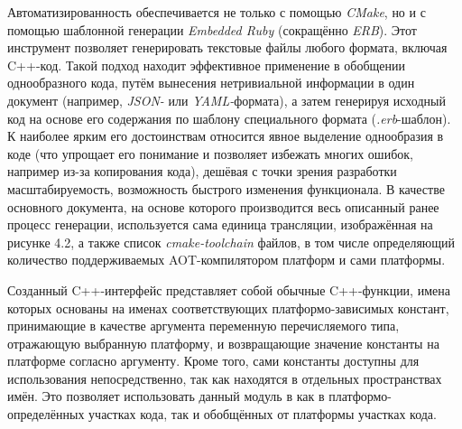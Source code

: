 \par
Автоматизированность обеспечивается не только с помощью \textit{CMake}, но и с помощью шаблонной генерации \textit{Embedded Ruby} (сокращённо \textit{ERB}). Этот инструмент позволяет генерировать текстовые файлы любого формата, включая C++-код. Такой подход находит эффективное применение в обобщении однообразного кода, путём вынесения нетривиальной информации в один документ (например, \textit{JSON-} или \textit{YAML-}формата), а затем генерируя исходный код на основе его содержания по шаблону специального формата (\textit{.erb}-шаблон). К наиболее ярким его достоинствам относится явное выделение однообразия в коде (что упрощает его понимание и позволяет избежать многих ошибок, например из-за копирования кода), дешёвая с точки зрения разработки масштабируемость, возможность быстрого изменения функционала. В качестве основного документа, на основе которого производится весь описанный ранее процесс генерации, используется сама единица трансляции, изображённая на рисунке 4.2, а также список \textit{cmake-toolchain} файлов, в том числе определяющий количество поддерживаемых AOT-компилятором платформ и сами платформы.

\par
Созданный C++-интерфейс представляет собой обычные C++-функции, имена которых основаны на именах соответствующих платформо-зависимых констант, принимающие в качестве аргумента переменную перечисляемого типа, отражающую выбранную платформу, и возвращающие значение константы на платформе согласно аргументу. Кроме того, сами константы доступны для использования непосредственно, так как находятся в отдельных пространствах имён. Это позволяет использовать данный модуль в как в платформо-определённых участках кода, так и обобщённых от платформы участках кода.

\newpage